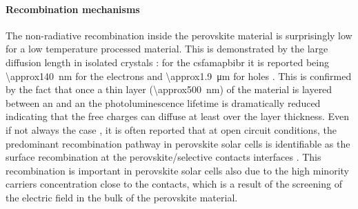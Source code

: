 	\paragraph{Recombination mechanisms}\label{intro_prv_recombination}
	The non-radiative recombination inside the perovskite material is surprisingly low for a low temperature processed material.
	This is demonstrated by the large diffusion length in isolated crystals \cite{Wehrenfennig2014,Wehrenfennig2014a,Stranks2013,Xing2013,Shi2015a,Eperon2014}: for the \gls{csfamapbibr} it is reported being \SI{\approx140}{\nm} for the electrons and \SI{\approx1.9}{\um} for holes \cite{Liu2017}.
	This is confirmed by the fact that once a thin layer (\SI{\approx500}{\nm}) of the material is layered between an  and an  the photoluminescence lifetime is dramatically reduced \cite{Jimenez-Lopez2017,Eperon2014} indicating that the free charges can diffuse at least over the layer thickness.
	Even if not always the case \cite{Valadez-Villalobos2019,Tress2018,Peng2016}, it is often reported that at open circuit conditions, the predominant recombination pathway in perovskite solar cells is identifiable as the surface recombination at the perovskite/\-selective contacts interfaces \cite{Calado2019,Stolterfoht2018a,Stolterfoht2018,Gelmetti2019,Shao2016,Correa-Baena2017,Hou2016}.
	This recombination is important in perovskite solar cells also due to the high minority carriers concentration close to the contacts, which is a result of the screening of the electric field in the bulk of the perovskite material.

